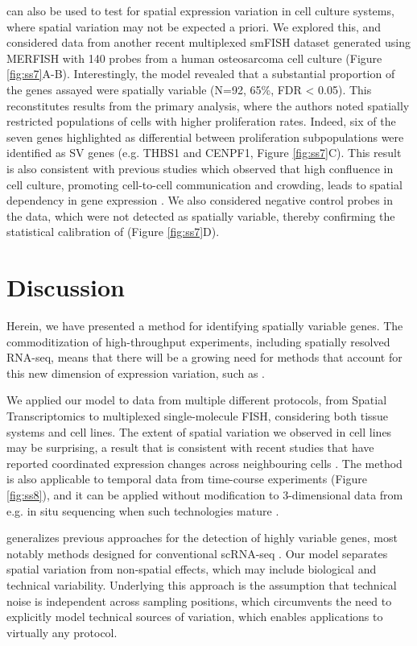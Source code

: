  can also be used to test for spatial expression variation in cell culture systems, where spatial variation may not be expected a priori. We explored this, and considered data from another recent multiplexed smFISH dataset generated using MERFISH with 140 probes from a human osteosarcoma cell culture \cite{Moffitt2016-bi} (Figure \ref{fig:ss7}A-B). Interestingly, the model revealed that a substantial proportion of the genes assayed were spatially variable (N=92, 65\%, FDR < 0.05). This reconstitutes results from the primary analysis, where the authors noted spatially restricted populations of cells with higher proliferation rates. Indeed, six of the seven genes highlighted as differential between proliferation subpopulations were identified as SV genes (e.g. THBS1 and CENPF1, Figure \ref{fig:ss7}C). This result is also consistent with previous studies which observed that high confluence in cell culture, promoting cell-to-cell communication and crowding, leads to spatial dependency in gene expression \cite{Battich2015-qu}. We also considered negative control probes in the data, which were not detected as spatially variable, thereby confirming the statistical calibration of  (Figure \ref{fig:ss7}D).

\section{Discussion}

Herein, we have presented a method for identifying spatially variable genes. The commoditization of high-throughput experiments, including spatially resolved RNA-seq, means that there will be a growing need for methods that account for this new dimension of expression variation, such as .

We applied our model to data from multiple different protocols, from Spatial Transcriptomics to multiplexed single-molecule FISH, considering both tissue systems and cell lines. The extent of spatial variation we observed in cell lines may be surprising, a result that is consistent with recent studies that have reported coordinated expression changes across neighbouring cells \cite{Battich2015-qu}. The method is also applicable to temporal data from time-course experiments (Figure \ref{fig:ss8}), and it can be applied without modification to 3-dimensional data from e.g. in situ sequencing when such technologies mature \cite{Lee2014-ix, Lee2015-sz}.

 generalizes previous approaches for the detection of highly variable genes, most notably methods designed for conventional scRNA-seq \cite{Brennecke2013-vv}. Our model separates spatial variation from non-spatial effects, which may include biological and technical variability. Underlying this approach is the assumption that technical noise is independent across sampling positions, which circumvents the need to explicitly model technical sources of variation, which enables applications to virtually any protocol.

